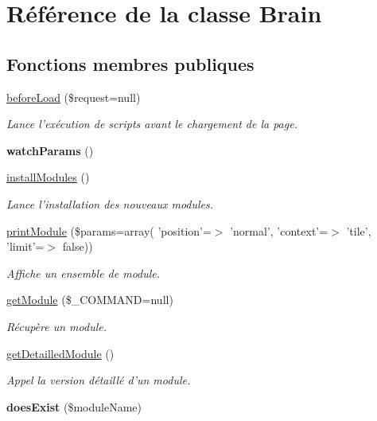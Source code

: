 \hypertarget{class_brain}{\section{Référence de la classe Brain}
\label{class_brain}
}
\subsection*{Fonctions membres publiques}
\begin{DoxyCompactItemize}
\item 
\hyperlink{class_brain_a8d48364438e83ad7028d50e01f5e1fa5}{before\-Load} (\$request=null)
\begin{DoxyCompactList}\small\item\em Lance l'exécution de scripts avant le chargement de la page. \end{DoxyCompactList}\item 
\hypertarget{class_brain_ad4cae2a1cc1dafc796e0eb91a0d59135}{{\bfseries watch\-Params} ()}\label{class_brain_ad4cae2a1cc1dafc796e0eb91a0d59135}

\item 
\hyperlink{class_brain_aa67d745e229a041e46e2d17886df9561}{install\-Modules} ()
\begin{DoxyCompactList}\small\item\em Lance l'installation des nouveaux modules. \end{DoxyCompactList}\item 
\hyperlink{class_brain_a4a39eefc177654e67cd313551e1a379a}{print\-Module} (\$params=array( 'position'=$>$ 'normal', 'context'=$>$ 'tile', 'limit'=$>$ false))
\begin{DoxyCompactList}\small\item\em Affiche un ensemble de module. \end{DoxyCompactList}\item 
\hyperlink{class_brain_af8585611cd92e75e5bac4bd913bcaca8}{get\-Module} (\$\-\_\-\-C\-O\-M\-M\-A\-N\-D=null)
\begin{DoxyCompactList}\small\item\em Récupère un module. \end{DoxyCompactList}\item 
\hyperlink{class_brain_a3f3f352c580a95b1e61cc05190770481}{get\-Detailled\-Module} ()
\begin{DoxyCompactList}\small\item\em Appel la version détaillé d'un module. \end{DoxyCompactList}\item 
\hypertarget{class_brain_abb25b394e899c801367123122ed0eea5}{{\bfseries does\-Exist} (\$module\-Name)}\label{class_brain_abb25b394e899c801367123122ed0eea5}


\end{DoxyCompactItemize}

